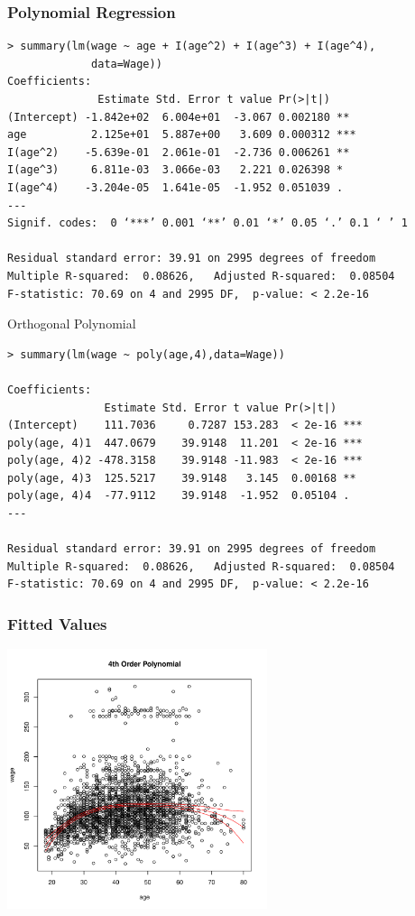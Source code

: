 \documentclass[]{beamer}\usepackage[]{graphicx}\usepackage[]{color}
\begin{document}
\begin{frame}[fragile]\frametitle{Polynomial Regression}
\begin{verbatim}
> summary(lm(wage ~ age + I(age^2) + I(age^3) + I(age^4),
             data=Wage))
Coefficients:
              Estimate Std. Error t value Pr(>|t|)
(Intercept) -1.842e+02  6.004e+01  -3.067 0.002180 **
age          2.125e+01  5.887e+00   3.609 0.000312 ***
I(age^2)    -5.639e-01  2.061e-01  -2.736 0.006261 **
I(age^3)     6.811e-03  3.066e-03   2.221 0.026398 *
I(age^4)    -3.204e-05  1.641e-05  -1.952 0.051039 .
---
Signif. codes:  0 ‘***’ 0.001 ‘**’ 0.01 ‘*’ 0.05 ‘.’ 0.1 ‘ ’ 1

Residual standard error: 39.91 on 2995 degrees of freedom
Multiple R-squared:  0.08626,	Adjusted R-squared:  0.08504
F-statistic: 70.69 on 4 and 2995 DF,  p-value: < 2.2e-16
\end{verbatim}

\end{frame}
\begin{frame}[fragile]{Orthogonal Polynomial}
\begin{verbatim}
> summary(lm(wage ~ poly(age,4),data=Wage))

Coefficients:
               Estimate Std. Error t value Pr(>|t|)
(Intercept)    111.7036     0.7287 153.283  < 2e-16 ***
poly(age, 4)1  447.0679    39.9148  11.201  < 2e-16 ***
poly(age, 4)2 -478.3158    39.9148 -11.983  < 2e-16 ***
poly(age, 4)3  125.5217    39.9148   3.145  0.00168 **
poly(age, 4)4  -77.9112    39.9148  -1.952  0.05104 .
---

Residual standard error: 39.91 on 2995 degrees of freedom
Multiple R-squared:  0.08626,	Adjusted R-squared:  0.08504
F-statistic: 70.69 on 4 and 2995 DF,  p-value: < 2.2e-16
\end{verbatim}
\end{frame}
\begin{frame}\frametitle{Fitted Values}
  \centerline{\includegraphics[height=3in]{poly}}
\end{frame}
\end{document}
